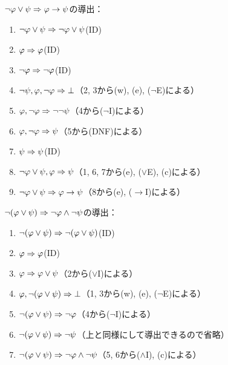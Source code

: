 \(\lnot \varphi \lor \psi \Rightarrow \varphi \to \psi\)の導出：
\begin{enumerate}
	\item \(\lnot \varphi \lor \psi \Rightarrow \lnot \varphi \lor \psi\)\quad (ID)
	\item \(\varphi \Rightarrow \varphi\)\quad (ID)
	\item \(\lnot \varphi \Rightarrow \lnot \varphi\)\quad (ID)
	\item \(\lnot \psi, \varphi, \lnot \varphi \Rightarrow \bot\)\quad （2, 3から(w), (e), (\(\lnot\)E)による）
	\item \(\varphi, \lnot \varphi \Rightarrow \lnot \lnot \psi\)\quad （4から(\(\lnot\)I)による）
	\item \(\varphi, \lnot \varphi \Rightarrow \psi\)\quad （5から(DNF)による）
	\item \(\psi \Rightarrow \psi\)\quad (ID)
	\item \(\lnot \varphi \lor \psi, \varphi \Rightarrow \psi\)\quad （1, 6, 7から(e), (\(\lor\)E), (c)による）
	\item \(\lnot \varphi \lor \psi \Rightarrow \varphi \to \psi\)\quad （8から(e), (\(\to\)I)による）
\end{enumerate}

\(\lnot \paren{\varphi \lor \psi} \sequent \lnot \varphi \land \lnot \psi\)の導出：
\begin{enumerate}
	\item \(\lnot \paren{\varphi \lor \psi} \sequent \lnot \paren{\varphi \lor \psi}\)\quad (ID)
	\item \(\varphi \Rightarrow \varphi\)\quad (ID)
	\item \(\varphi \Rightarrow \varphi \lor \psi\)\quad （2から(\(\lor\)I)による）
	\item \(\varphi, \lnot \paren{\varphi \lor \psi} \sequent \bot\)\quad （1, 3から(w), (e), (\(\lnot\)E)による）
	\item \(\lnot \paren{\varphi \lor \psi} \sequent \lnot \varphi\)\quad （4から(\(\lnot\)I)による）
	\item \(\lnot \paren{\varphi \lor \psi} \sequent \lnot \psi\)\quad （上と同様にして導出できるので省略）
	\item \(\lnot \paren{\varphi \lor \psi} \sequent \lnot \varphi \land \lnot \psi\)\quad （5, 6から(\(\land\)I), (c)による）
\end{enumerate}

